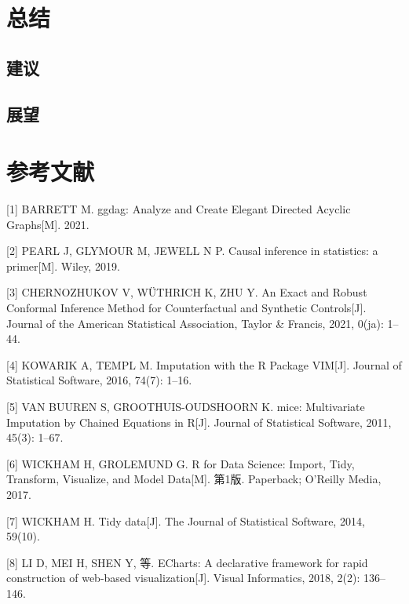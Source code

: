 \documentclass[]{ctexart}
\begin{document}
\hypertarget{ux603bux7ed3}{%
\section{总结}\label{ux603bux7ed3}}

\hypertarget{ux5efaux8bae}{%
\subsection{建议}\label{ux5efaux8bae}}

\hypertarget{ux5c55ux671b}{%
\subsection{展望}\label{ux5c55ux671b}}

\hypertarget{ux53c2ux8003ux6587ux732e}{%
\section*{参考文献}\label{ux53c2ux8003ux6587ux732e}}

\hypertarget{refs}{}
\leavevmode\hypertarget{ref-citation_ggdag}{}%
{[}1{]} BARRETT M. ggdag: Analyze and Create Elegant Directed Acyclic
Graphs{[}M{]}. 2021.

\leavevmode\hypertarget{ref-pearl}{}%
{[}2{]} PEARL J, GLYMOUR M, JEWELL N P. Causal inference in statistics:
a primer{[}M{]}. Wiley, 2019.

\leavevmode\hypertarget{ref-doi:10.1080ux2f01621459.2021.1920957}{}%
{[}3{]} CHERNOZHUKOV V, WÜTHRICH K, ZHU Y. An Exact and Robust Conformal
Inference Method for Counterfactual and Synthetic Controls{[}J{]}.
Journal of the American Statistical Association, Taylor \& Francis,
2021, 0(ja): 1--44.

\leavevmode\hypertarget{ref-citation_VIM}{}%
{[}4{]} KOWARIK A, TEMPL M. Imputation with the R Package VIM{[}J{]}.
Journal of Statistical Software, 2016, 74(7): 1--16.

\leavevmode\hypertarget{ref-citation_mice}{}%
{[}5{]} VAN BUUREN S, GROOTHUIS-OUDSHOORN K. mice: Multivariate
Imputation by Chained Equations in R{[}J{]}. Journal of Statistical
Software, 2011, 45(3): 1--67.

\leavevmode\hypertarget{ref-Wickham2017R}{}%
{[}6{]} WICKHAM H, GROLEMUND G. R for Data Science: Import, Tidy,
Transform, Visualize, and Model Data{[}M{]}. 第1版. Paperback; O'Reilly
Media, 2017.

\leavevmode\hypertarget{ref-tidy-data}{}%
{[}7{]} WICKHAM H. Tidy data{[}J{]}. The Journal of Statistical
Software, 2014, 59(10).

\leavevmode\hypertarget{ref-LI2018136}{}%
{[}8{]} LI D, MEI H, SHEN Y, 等. ECharts: A declarative framework for
rapid construction of web-based visualization{[}J{]}. Visual
Informatics, 2018, 2(2): 136--146.
\end{document}
